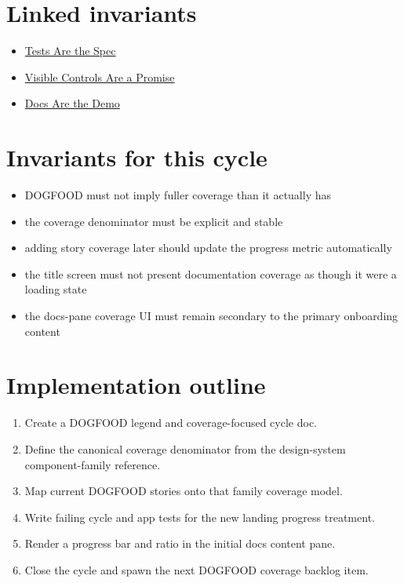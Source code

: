 \section{Linked invariants}\label{record-064-linked-invariants}

\begin{itemize}
\tightlist
\item
  \href{https://github.com/flyingrobots/bijou/blob/cbd70612140e7a450d764b3c7be1c6af878b99bc/docs/invariants/tests-are-the-spec.md}{Tests Are the Spec}
\item
  \href{https://github.com/flyingrobots/bijou/blob/cbd70612140e7a450d764b3c7be1c6af878b99bc/docs/invariants/visible-controls-are-a-promise.md}{Visible Controls Are a Promise}
\item
  \href{https://github.com/flyingrobots/bijou/blob/cbd70612140e7a450d764b3c7be1c6af878b99bc/docs/invariants/docs-are-the-demo.md}{Docs Are the Demo}
\end{itemize}

\section{Invariants for this cycle}\label{record-064-invariants-for-this-cycle}

\begin{itemize}
\tightlist
\item
  DOGFOOD must not imply fuller coverage than it actually has
\item
  the coverage denominator must be explicit and stable
\item
  adding story coverage later should update the progress metric automatically
\item
  the title screen must not present documentation coverage as though it were a loading state
\item
  the docs-pane coverage UI must remain secondary to the primary onboarding content
\end{itemize}

\section{Implementation outline}\label{record-064-implementation-outline}

\begin{enumerate}
\def\labelenumi{\arabic{enumi}.}
\tightlist
\item
  Create a DOGFOOD legend and coverage-focused cycle doc.
\item
  Define the canonical coverage denominator from the design-system component-family reference.
\item
  Map current DOGFOOD stories onto that family coverage model.
\item
  Write failing cycle and app tests for the new landing progress treatment.
\item
  Render a progress bar and ratio in the initial docs content pane.
\item
  Close the cycle and spawn the next DOGFOOD coverage backlog item.
\end{enumerate}

